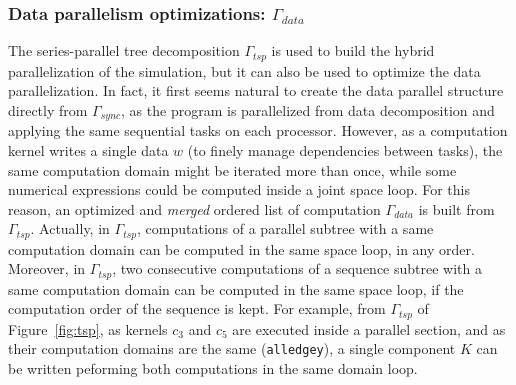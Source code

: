 \subsubsection*{Data parallelism optimizations: $\Gamma_{data}$}
The series-parallel tree decomposition $\Gamma_{tsp}$ is used to build the hybrid parallelization of the simulation, but it can also be used to optimize the data parallelization. In fact, it first seems natural to create the data parallel structure directly from $\Gamma_{sync}$, as the program is parallelized from data decomposition and applying the same sequential tasks on each processor. However, as a computation kernel writes a single data $w$ (to finely manage dependencies between tasks), the same computation domain might be iterated more than once, while some numerical expressions could be computed inside a joint space loop. For this reason, an optimized and \emph{merged} ordered list of computation $\Gamma_{data}$ is built from $\Gamma_{tsp}$. Actually, in $\Gamma_{tsp}$, computations of a parallel subtree with a same computation domain can be computed in the same space loop, in any order. Moreover, in $\Gamma_{tsp}$, two consecutive computations of a sequence subtree with a same computation domain can be computed in the same space loop, if the computation order of the sequence is kept. For example, from $\Gamma_{tsp}$ of Figure~\ref{fig:tsp}, as kernels $c_3$ and $c_5$ are executed inside a parallel section, and as their computation domains are the same (\texttt{alledgey}), a single component $K$ can be written peforming both computations in the same domain loop.



